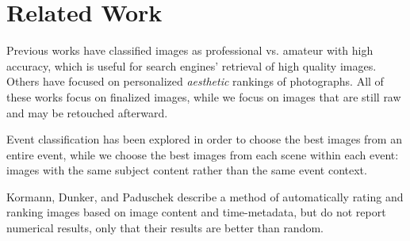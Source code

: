 \documentclass{article}
\begin{document}
\section{Related Work}

Previous works have classified images as professional vs. amateur with high accuracy\cite{1640788}\cite{springerlink:10.1007/11744078_23}\cite{springerlink:10.1007/978-3-540-88690-7_29}, which is useful for search engines' retrieval of high quality images. Others have focused on personalized \emph{aesthetic} rankings of photographs\cite {Sun:2009:PAB:1631272.1631351}\cite {Yeh:2010:PPR:1873951.1873963}. All of these works focus on finalized images, while we focus on images that are still raw and may be retouched afterward.

Event classification has been explored in order to choose the best images from an entire event\cite{1223566}\cite{4444209}, while we choose the best images from each scene within each event: images with the same subject content rather than the same event context.

Kormann, Dunker, and Paduschek\cite{springerlink:10.1007/978-3-642-10543-2_23} describe a method of automatically rating and ranking images based on image content and time-metadata, but do not report numerical results, only that their results are better than random. 




\end{document}
